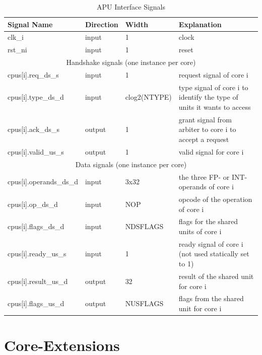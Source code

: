 \documentclass[%
 oneside,      %
 openany,      %
 halfparskip,  %
]{scrbook}
\begin{document}
\begin{table}[t]\footnotesize
\begin{threeparttable}
\renewcommand\arraystretch{0.5}
\caption{APU Interface Signals}
\centering
\label{tab_apu_interface}
\begin{tabularx}{\textwidth}{@{}l|p{1.5cm}|p{2cm}|p{7.5cm}@{}}
\toprule
\textbf{Signal Name} & \textbf{Direction} & \textbf{Width} & \textbf{Explanation}\\
\midrule
clk\_i & input &  1 & clock\\
rst\_ni & input &  1 & reset\\
\midrule
\multicolumn{4}{c}{Handshake signals (one instance per core)}\\
\midrule
cpus[i].req\_ds\_s & input & 1             & request signal of core i \\
cpus[i].type\_ds\_d & input & clog2(NTYPE) & type signal of core i to identify the type of units it wants to access\\
cpus[i].ack\_ds\_s & output & 1            & grant signal from arbiter to core i to accept a request\\
cpus[i].valid\_us\_s & output & 1          & valid signal for core i\\
\midrule
\multicolumn{4}{c}{Data signals (one instance per core)}\\
\midrule
cpus[i].operands\_ds\_d & input            & 3x32 & the three FP- or INT-operands of core i \\
cpus[i].op\_ds\_d & input & NOP            & opcode of the operation of core i\\
cpus[i].flags\_ds\_d & input & NDSFLAGS    & flags for the shared units of core i\\
cpus[i].ready\_us\_s & input & 1           & ready signal of core i (not used statically set to 1)\\
cpus[i].result\_us\_d & output & 32        & result of the shared unit for core i\\
cpus[i].flags\_us\_d & output & NUSFLAGS   & flags from the shared unit for core i\\
\bottomrule
\end{tabularx}
\end{threeparttable}
\end{table}

\chapter{Core-Extensions}\label{ch:coreext}
\end{document}
